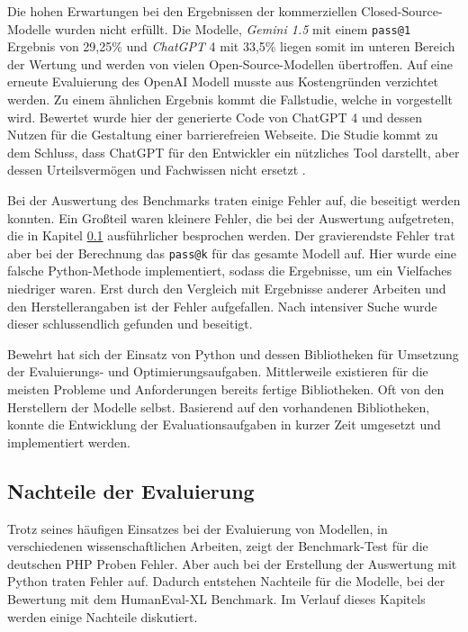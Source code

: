 Die hohen Erwartungen bei den Ergebnissen der kommerziellen Closed-Source-Modelle wurden nicht erfüllt. Die Modelle, \textit{Gemini 1.5} mit einem \texttt{pass@1} Ergebnis von 29,25\% und \textit{ChatGPT} 4 mit 33,5\% liegen somit im unteren Bereich der Wertung und werden von vielen Open-Source-Modellen übertroffen. Auf eine erneute Evaluierung des OpenAI Modell musste aus Kostengründen verzichtet werden.
Zu einem ähnlichen Ergebnis kommt die Fallstudie, welche in \cite{ahmed-2025} vorgestellt wird. Bewertet wurde hier der generierte Code von ChatGPT 4 und dessen Nutzen für die Gestaltung einer barrierefreien Webseite. Die Studie kommt zu dem Schluss, dass ChatGPT für den Entwickler ein nützliches Tool darstellt, aber dessen Urteilsvermögen und Fachwissen nicht ersetzt \parencite[vgl.][10]{ahmed-2025}.\vspace{0.2cm}

Bei der Auswertung des Benchmarks traten einige Fehler auf, die beseitigt werden konnten. Ein Großteil waren kleinere Fehler, die bei der Auswertung aufgetreten, die in Kapitel \ref{subsec:disadvantages_of_evaluation} ausführlicher besprochen werden. Der gravierendste Fehler trat aber bei der Berechnung das \texttt{pass@k} für das gesamte Modell auf. Hier wurde eine falsche Python-Methode implementiert, sodass die Ergebnisse, um ein Vielfaches niedriger waren. Erst durch den Vergleich mit Ergebnisse anderer Arbeiten und den Herstellerangaben ist der Fehler aufgefallen. Nach intensiver Suche wurde dieser schlussendlich gefunden und beseitigt.\vspace{0.2cm}

Bewehrt hat sich der Einsatz von Python und dessen Bibliotheken für Umsetzung der Evaluierungs- und Optimierungsaufgaben. Mittlerweile existieren für die meisten Probleme und Anforderungen bereits fertige Bibliotheken. Oft von den Herstellern der Modelle selbst. Basierend auf den vorhandenen Bibliotheken, konnte die Entwicklung der Evaluationsaufgaben in kurzer Zeit umgesetzt und implementiert werden.\vspace{0.2cm}



\subsection{Nachteile der Evaluierung}\label{subsec:disadvantages_of_evaluation}
Trotz seines häufigen Einsatzes bei der Evaluierung von Modellen, in verschiedenen wissenschaftlichen Arbeiten, zeigt der Benchmark-Test für die deutschen PHP Proben Fehler. Aber auch bei der Erstellung der Auswertung mit Python traten Fehler auf. Dadurch entstehen Nachteile für die Modelle, bei der Bewertung mit dem HumanEval-XL Benchmark. Im Verlauf dieses Kapitels werden einige Nachteile diskutiert.\vspace{0.2cm}

